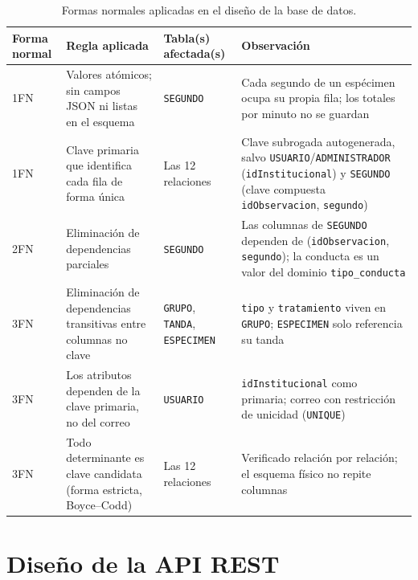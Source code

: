 \begin{table}[H]
\centering
\caption{Formas normales aplicadas en el diseño de la base de datos.}
\label{tab:normalizacion}
\small
\begin{tabular}{|p{1.5cm}|p{4.0cm}|p{3.1cm}|p{4.4cm}|}
\hline
\textbf{Forma normal} & \textbf{Regla aplicada} & \textbf{Tabla(s) afectada(s)} & \textbf{Observación} \\
\hline
1FN &
  Valores atómicos; sin campos JSON ni listas en el esquema &
  \texttt{SEGUNDO} &
  Cada segundo de un espécimen ocupa su propia fila; los totales por minuto no
  se guardan \\
\hline
1FN &
  Clave primaria que identifica cada fila de forma única &
  Las 12 relaciones &
  Clave subrogada autogenerada, salvo \texttt{USUARIO}/\texttt{ADMINISTRADOR}
  (\texttt{idInstitucional}) y
  \texttt{SEGUNDO} (clave compuesta \texttt{idObservacion}, \texttt{segundo}) \\
\hline
2FN &
  Eliminación de dependencias parciales &
  \texttt{SEGUNDO} &
  Las columnas de \texttt{SEGUNDO} dependen de
  (\texttt{idObservacion}, \texttt{segundo}); la conducta es un valor del dominio
  \texttt{tipo\_conducta} \\
\hline
3FN &
  Eliminación de dependencias transitivas entre columnas no clave &
  \texttt{GRUPO}, \texttt{TANDA}, \texttt{ESPECIMEN} &
  \texttt{tipo} y \texttt{tratamiento} viven en \texttt{GRUPO};
  \texttt{ESPECIMEN} solo referencia su tanda \\
\hline
3FN &
  Los atributos dependen de la clave primaria, no del correo &
  \texttt{USUARIO} &
  \texttt{idInstitucional} como primaria; correo con restricción de unicidad
  (\texttt{UNIQUE}) \\
\hline
3FN &
  Todo determinante es clave candidata (forma estricta, Boyce--Codd) &
  Las 12 relaciones &
  Verificado relación por relación; el esquema físico no repite columnas \\
\hline
\end{tabular}
\end{table}

\section{Diseño de la API REST}

